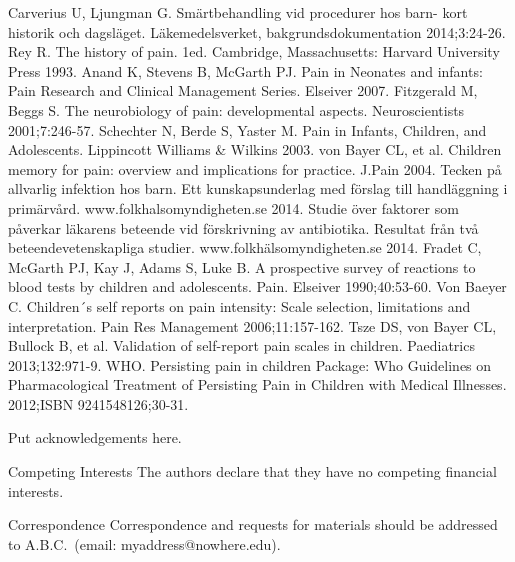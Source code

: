 \documentclass{nature}
\begin{document}


\begin{thebibliography}{1}
 Carverius U, Ljungman G. Sm\"artbehandling vid procedurer
hos barn- kort historik och dagsl\"aget. L\"akemedelsverket, bakgrundsdokumentation 2014;3:24-26. 
 Rey R. The history of pain. 1ed. Cambridge, Massachusetts:
Harvard University Press 1993.
Anand K, Stevens B, McGarth PJ. Pain in Neonates and infants:
Pain Research and Clinical Management Series. Elseiver 2007.
Fitzgerald M, Beggs S. The neurobiology of pain:
developmental aspects. Neuroscientists         2001;7:246-57.
 Schechter N, Berde S, Yaster M. Pain in Infants,
Children, and Adolescents. Lippincott Williams & Wilkins 2003.
 von Bayer CL, et al. Children memory for pain: overview and implications for practice. J.Pain 2004.
 Tecken p\r{a} allvarlig infektion hos barn. Ett kunskapsunderlag med f\"orslag till handl\"aggning i    prim\"arv\r{a}rd. www.folkhalsomyndigheten.se 2014.
 Studie \"over faktorer som p\r{a}verkar l\"akarens beteende vid f\"orskrivning av antibiotika. Resultat fr\r{a}n tv\r{a} beteendevetenskapliga studier. www.folkh\"alsomyndigheten.se 2014.
 Fradet C, McGarth PJ, Kay J, Adams S, Luke B. A prospective survey of reactions to blood        tests by children and adolescents. Pain. Elseiver 1990;40:53-60.
 Von Baeyer C.    Children´s self reports on pain intensity: Scale selection, limitations and            interpretation. Pain Res Management 2006;11:157-162.
 Tsze DS, von Bayer CL, Bullock B, et al. Validation of self-report pain scales in children.     Paediatrics 2013;132:971-9.
 WHO. Persisting pain in children Package: Who Guidelines on Pharmacological Treatment   of Persisting Pain in Children with Medical Illnesses. 2012;ISBN 9241548126;30-31.

\end{thebibliography}



\begin{addendum}
 \item Put acknowledgements here.
 \item[Competing Interests] The authors declare that they have no
competing financial interests.
 \item[Correspondence] Correspondence and requests for materials
should be addressed to A.B.C.~(email: myaddress@nowhere.edu).
\end{addendum}

\end{document}
